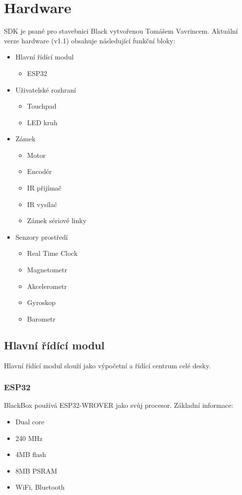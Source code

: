 \newpage
\section{Hardware}
SDK je psané pro stavebnici Black vytvořenou Tomášem Vavrincem.
Aktuální verze hardware (v1.1) obsahuje následující funkční bloky:

\begin{itemize}[noitemsep]
    \item Hlavní řídící modul
        \begin{itemize}[noitemsep]
            \item ESP32
        \end{itemize}
    \item Uživatelské rozhraní
        \begin{itemize}[noitemsep]
            \item Touchpad
            \item LED kruh
        \end{itemize}
    \item Zámek
        \begin{itemize}[noitemsep]
            \item Motor
            \item Encodér
            \item IR přijímač
            \item IR vysílač
            \item Zámek sériové linky
        \end{itemize}
    \item Senzory prostředí
        \begin{itemize}[noitemsep]
            \item Real Time Clock
            \item Magnetometr
            \item Akcelerometr
            \item Gyroskop
            \item Barometr
        \end{itemize}
\end{itemize}

\newpage
\subsection{Hlavní řídící modul}
Hlavní řídící modul slouží jako výpočetní a řídící centrum celé desky.

\subsubsection{ESP32}
BlackBox používá ESP32-WROVER jako svůj procesor.
Základní informace:
\begin{itemize}
    \item Dual core
    \item 240 MHz
    \item 4MB flash
    \item 8MB PSRAM
    \item WiFi, Bluetooth
\end{itemize}

